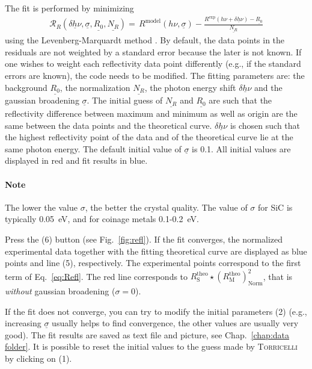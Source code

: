 \documentclass[oldfontcommands,openany,oneside]{memoir}
\begin{document}
The fit is performed by minimizing
\begin{align} \label{eq:Refl}
  \mathcal{R}_R(\underline{\delta h\nu}, \underline{\sigma}, \underline{R_0}, \underline{N_R})  = \, R^\mathrm{model}\left(h\nu, \underline{\sigma}\right) - \frac{R^\mathrm{exp}(h\nu + \underline{\delta h\nu})-\underline{R_0}}{\underline{N_R}}
\end{align}
using the Levenberg-Marquardt method \cite{Levenberg1944,Marquardt1963,lmfit}. By default, the data points in the residuals are not weighted by a standard error because the later is not known. If one wishes to weight each reflectivity data point differently (e.g., if the standard errors are known), the code needs to be modified. The fitting parameters are: the background $\underline{R_0}$, the normalization $\underline{N_R}$, the photon energy shift $\underline{\delta h \nu}$ and the gaussian broadening $\underline{\sigma}$. The initial guess of $\underline{N_R}$ and $\underline{R_0}$ are such that the reflectivity difference between maximum and minimum as well as origin are the same between the data points and the theoretical curve. $\underline{\delta h \nu}$ is chosen such that the highest reflectivity point of the data and of the theoretical curve lie at the same photon energy. The default initial value of $\underline{\sigma}$ is 0.1. All initial values are displayed in red and fit results in blue.

\paragraph{Note} The lower the value $\sigma$, the better the crystal quality. The value of $\sigma$ for SiC is typically 0.05~eV, and for coinage metals 0.1-0.2~eV.


Press the  (6) button (see Fig.~\ref{fig:refl}). If the fit converges, the normalized experimental data together with the fitting theoretical curve are displayed as blue points and line (5), respectively. The experimental points correspond to the first term of Eq.~\ref{eq:Refl}. The red line corresponds to $R^\mathrm{theo}_\mathrm{S} \star \left(R^\mathrm{theo}_\mathrm{M}\right)^2_\mathrm{Norm}$, that is \emph{without} gaussian broadening ($\sigma=0$).

If the fit does not converge, you can try to modify the initial parameters (2) (e.g., increasing $\underline{\sigma}$ usually helps to find convergence, the other values are usually very good). The fit results are saved as text file and picture, see Chap.~\ref{chap:data folder}. It is possible to reset the initial values to the guess made by \textsc{Torricelli} by clicking on  (1). 
\end{document}
